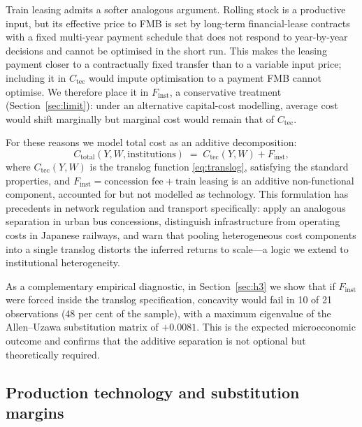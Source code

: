 \documentclass[11pt,a4paper]{article}
\begin{document}
Train leasing admits a softer analogous argument. Rolling stock is a
productive input, but its effective price to FMB is set by long-term
financial-lease contracts with a fixed multi-year payment schedule that
does not respond to year-by-year decisions and cannot be optimised in the
short run. This makes the leasing payment closer to a contractually fixed
transfer than to a variable input price; including it in $C_{\text{tec}}$
would impute optimisation to a payment FMB cannot optimise. We therefore
place it in $F_{\text{inst}}$, a conservative treatment
(Section~\ref{sec:limit}): under an alternative capital-cost modelling,
average cost would shift marginally but marginal cost would remain that of
$C_{\text{tec}}$.

For these reasons we model total cost as an additive decomposition:
\begin{equation}
C_{\text{total}}(Y, W, \text{institutions}) \;=\; C_{\text{tec}}(Y, W) +
F_{\text{inst}},
\label{eq:additive}
\end{equation}
where $C_{\text{tec}}(Y, W)$ is the translog function \eqref{eq:translog},
satisfying the standard properties, and
$F_{\text{inst}} = \text{concession fee} + \text{train leasing}$ is an
additive non-functional component, accounted for but not modelled as
technology. This formulation has precedents in network regulation
\citep{joskow2008} and transport specifically:
\citet{gagnepainivaldi2002} apply an analogous separation in urban bus
concessions, \citet{mizutaniuranishi2013} distinguish infrastructure from
operating costs in Japanese railways, and \citet{wheat2015} warn that
pooling heterogeneous cost components into a single translog distorts the
inferred returns to scale---a logic we extend to institutional
heterogeneity.

As a complementary empirical diagnostic, in Section~\ref{sec:h3} we show
that if $F_{\text{inst}}$ were forced inside the translog specification,
concavity would fail in 10 of 21 observations (48 per cent of the
sample), with a maximum eigenvalue of the Allen--Uzawa substitution
matrix of $+0.0081$. This is the expected microeconomic outcome and
confirms that the additive separation is not optional but theoretically
required.

\subsection{Production technology and substitution margins}
\label{sec:margins}
\end{document}
